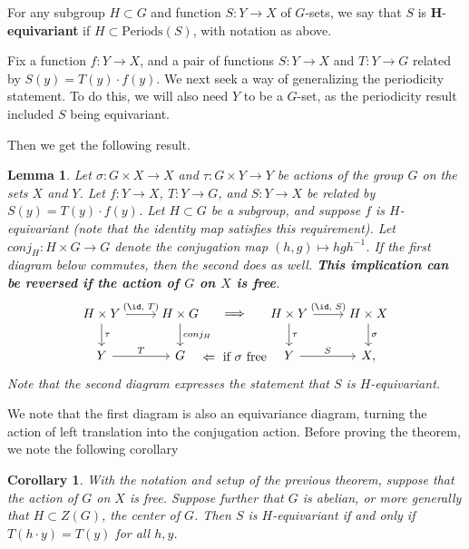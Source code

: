 \documentclass[12nt]{article}
\theoremstyle{plain}
\newtheorem{lemma}{Lemma}
\newtheorem{corollary}[theorem]{Corollary}
\begin{document}
For any subgroup $H \subset G$ and function $S : Y \to X$ of $G$-sets, we say that $S$ is $\mathbf{H}$-\textbf{equivariant} if $H \subset \text{Periods}(S)$, with notation as above.

 
Fix a function $f : Y \to X$, and a pair of functions $S : Y \to X$ and $T : Y \to G$ related by $S(y) = T(y) \cdot f(y)$. We next seek a way of generalizing the periodicity statement. To do this, we will also need $Y$ to be a $G$-set, as the periodicity result included $S$ being equivariant. 

Then we get the following result.
\begin{lemma}\label{equivariance_throw_heights}
Let $\sigma : G \times X \to X$ and $\tau : G \times Y \to Y$ be actions of the group $G$ on the sets $X$ and $Y$. Let $f : Y \to X$, $T : Y \to G$, and $S : Y \to X$ be related by $S(y) = T(y) \cdot f(y)$. Let $H \subset G$ be a subgroup, and suppose $f$ is $H$-equivariant (note that the identity map satisfies this requirement). Let $conj_H : H \times G \to G$ denote the conjugation map $(h, g) \mapsto hgh^{-1}$. If the first diagram below commutes, then the second does as well. \textbf{This implication can be reversed if the action of $G$ on $X$ is free}. 
\[
\begin{tikzcd}
H \times Y \ar[r, "(\id \text{, } T)"] \ar[d, "\tau"{name=L}] & H \times G \ar[d, "conj_H"] \ar[rr, phantom, "\implies"] &&  H \times Y \ar[r, "(\id \text{, } S)"] \ar[d, "\tau"] & H \times X \ar[d, "\sigma"{name=R}] \\
Y \ar[r, "T"] & G && Y \ar[r, "S"] \ar[ll, phantom, "\Leftarrow \text{ if } \sigma \text{ free}"] & X,
\end{tikzcd}
\]
Note that the second diagram expresses the statement that $S$ is $H$-equivariant.
\end{lemma} 

We note that the first diagram is also an equivariance diagram, turning the action of left translation into the conjugation action. Before proving the theorem, we note the following corollary

\begin{corollary}
With the notation and setup of the previous theorem, suppose that the action of $G$ on $X$ is free. Suppose further that $G$ is abelian, or more generally that $H \subset Z(G)$, the center of $G$. Then $S$ is $H$-equivariant if and only if $T(h \cdot y) = T(y)$ for all $h, y$. \label{abelian_equivariance_throw_heights} \end{corollary}
\end{document}
